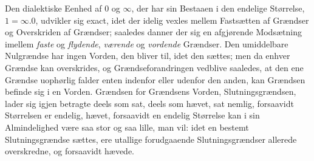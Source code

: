 \documentclass[12pt,a4paper]{book}
\begin{document}
Den dialektiske Eenhed af $0$ og $\infty$, der har sin Bestaaen
i den endelige Størrelse, $1 = \infty. 0$, udvikler sig exact,
idet der idelig vexles mellem Fastsætten af Grændser og Overskriden
af Grændser; saaledes danner der sig en afgjørende Modsætning
imellem \emph{faste} og \emph{flydende}, \emph{værende} og
\emph{vordende} Grændser. Den umiddelbare Nulgrændse har ingen Vorden,
den bliver til, idet den sættes; men da enhver Grændse kan
overskrides, og Grændseforandringen vedblive saaledes, at den
ene Grændse uophørlig falder enten indenfor eller udenfor
den anden, kan Grændsen befinde sig i en Vorden. Grændsen
for Grændsens Vorden, Slutningsgrændsen, lader sig igjen
betragte deels som sat, deels som hævet, sat nemlig, forsaavidt
Størrelsen er endelig, hævet, forsaavidt en endelig
Størrelse kan i sin Almindelighed være saa stor og saa lille,
man vil: idet en bestemt Slutningsgrændse sættes, ere utallige
forudgaaende Slutningsgrændser allerede overskredne, og forsaavidt
hævede.
\end{document}
